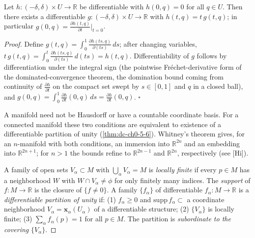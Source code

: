 \begin{lemma}
  \label{lem:dc-ch0-5-5}
  \leanok
  Let $h:(-\delta,\delta)\times U\to\mathbb{R}$ be differentiable with $h(0,q)=0$
  for all $q\in U$. Then there exists a differentiable
  $g:(-\delta,\delta)\times U\to\mathbb{R}$ with $h(t,q)=t\,g(t,q)$; in particular
  $g(0,q)=\frac{\partial h(t,q)}{\partial t}\big|_{t=0}$.
\end{lemma}
\begin{proof}
  \sketch
  \leanok
  Define $g(t,q)=\int_0^1\frac{\partial h(ts,q)}{\partial(ts)}\,ds$; after
  changing variables, $t\,g(t,q)=\int_0^t\frac{\partial h(ts,q)}{\partial(ts)}\,d(ts)=h(t,q)$.
  Differentiability of $g$ follows by differentiation under the integral sign
  (the pointwise Fréchet-derivative form of the dominated-convergence theorem, the
  domination bound coming from continuity of $\frac{\partial h}{\partial t}$ on the
  compact set swept by $s\in[0,1]$ and $q$ in a closed ball), and
  $g(0,q)=\int_0^1\frac{\partial h}{\partial t}(0,q)\,ds=\frac{\partial h}{\partial t}(0,q)$.
  $\square$

  A manifold need not be Hausdorff or have a countable coordinate basis. For a
  connected manifold these two conditions are equivalent to existence of a
  differentiable partition of unity (\cref{thm:dc-ch0-5-6}). Whitney's theorem gives,
  for an $n$-manifold with both conditions, an immersion into $\mathbb{R}^{2n}$ and
  an embedding into $\mathbb{R}^{2n+1}$; for $n>1$ the bounds refine to
  $\mathbb{R}^{2n-1}$ and $\mathbb{R}^{2n}$, respectively (see [Hi]).
  
  A family of open sets $V_\alpha\subset M$ with $\bigcup_\alpha V_\alpha=M$ is
  \emph{locally finite} if every $p\in M$ has a neighborhood $W$ with $W\cap V_\alpha\neq\phi$
  for only finitely many indices. The \emph{support} of $f:M\to\mathbb{R}$ is the
  closure of $\{f\neq0\}$. A family $\{f_\alpha\}$ of differentiable
  $f_\alpha:M\to\mathbb{R}$ is a \emph{differentiable partition of unity} if:
  (1) $f_\alpha\ge0$ and $\mathrm{supp}\,f_\alpha\subset$ a coordinate neighborhood
  $V_\alpha=\mathbf{x}_\alpha(U_\alpha)$ of a differentiable structure;
  (2) $\{V_\alpha\}$ is locally finite;
  (3) $\sum_\alpha f_\alpha(p)=1$ for all $p\in M$.
  The partition is \emph{subordinate to the covering} $\{V_\alpha\}$.
\end{proof}

